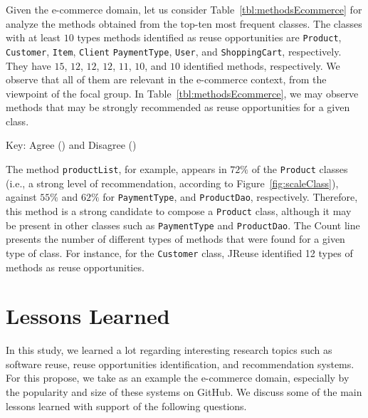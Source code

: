 Given the e-commerce domain, let us consider Table~\ref{tbl:methodsEcommerce} for analyze the methods obtained from the top-ten most frequent classes. The classes with at least $10$ types methods identified as reuse opportunities are \texttt{Product}, \texttt{Customer}, \texttt{Item},	\texttt{Client}	\texttt{PaymentType},	\texttt{User}, and \texttt{ShoppingCart}, respectively. They have $15$, $12$, $12$, $12$, $11$, $10$, and $10$ identified methods, respectively. We observe that all of them are relevant in the e-commerce context, from the viewpoint of the focal group. In Table~\ref{tbl:methodsEcommerce}, we may observe methods that may be strongly recommended as reuse opportunities for a given class. 


\newpage
\noindent
\begin{adjustwidth}{0.6cm}{0cm}
Key: Agree (\checkmark) and Disagree (\xmark)\\
\end{adjustwidth}

The method \texttt{productList}, for example,  appears in $72\%$ of the \texttt{Product} classes (i.e., a strong level of recommendation, according to Figure~\ref{fig:scaleClass}), against $55\%$ and $62\%$ for \texttt{PaymentType}, and \texttt{ProductDao}, respectively.  Therefore, this method is a strong candidate to compose a \texttt{Product} class, although it may be present in other classes such as \texttt{PaymentType} and \texttt{ProductDao}. The Count line presents the number of different types of methods that were found for a given type of class. For instance, for the \texttt{Customer} class, JReuse identified 12 types of methods as reuse opportunities. 


\newpage
\section{Lessons Learned}
\label{sec:lessons}

In this study, we learned a lot regarding interesting research topics such as software reuse, reuse opportunities identification, and recommendation systems. For this propose, we take as an example the e-commerce domain, especially by the popularity and size of these systems  on GitHub. We discuss some of the main lessons learned with support of the following questions.


